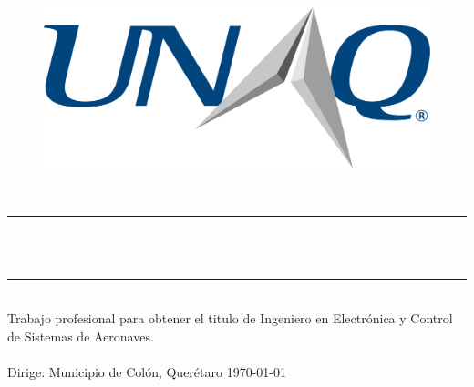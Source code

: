 %
\begin{titlepage}
	\begin{center}
		{\LARGE\thesisUniversityInstitute}\\[10mm]
		\begin{figure}[h]
			\centering
			\includegraphics[scale=0.4]{Contenido/Titulo/Logo.eps}
		\end{figure}
		\vspace{1cm}
		{\large \thesisSubject}\\[5mm]
		\rule{120mm}{0.5mm} \\[2mm]
		{\huge \thesisTitle}\\[2mm]
		\rule{120mm}{0.5mm} \\[10mm]
		\Large Trabajo profesional para obtener el titulo de Ingeniero en Electrónica y Control de Sistemas de Aeronaves.
		\\
		\vspace{1cm}
		\Large \thesisName
		\\
		\vspace{1cm}
		\Large Dirige: \thesisFirstReviewer
		\vfill
		\large 
		Municipio de Colón, Querétaro \hfill \today
		
		
	\end{center}


\clearpage

\end{titlepage}


